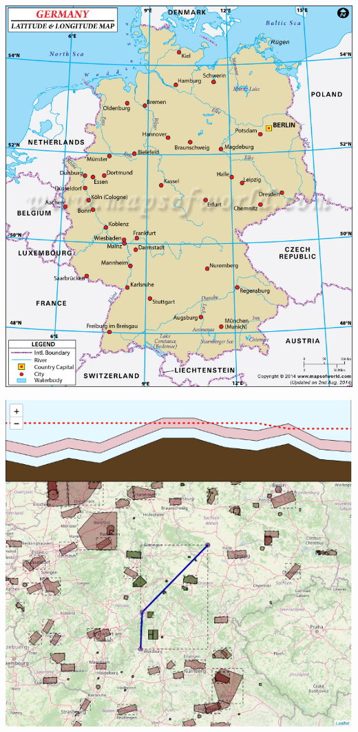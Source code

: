 \begin{center}
    \includegraphics[width=\columnwidth]{images/map-germany}
    \label{fig:REPLACE}
\end{center}







\begin{center}
    \includegraphics[width=\columnwidth]{images/final-map-with-routing-and-height-profile}
    \label{fig:REPLACE}
\end{center}

